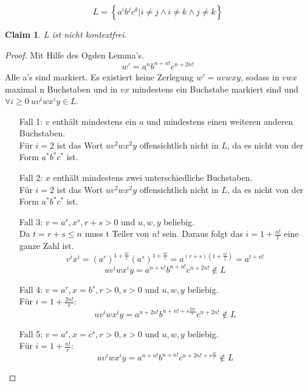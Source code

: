 \documentclass[]{article}
\newtheorem{claim}[theorem]{Claim}
\begin{document}
$$L=\left\lbrace a^ib^jc^k|i\neq j \wedge i\neq k \wedge j\neq k \right\rbrace$$
\begin{claim}
L ist nicht kontextfrei.
\end{claim}
\begin{proof}
Mit Hilfe des Ogden Lemma's.
$$w'=\underline{a^n}b^{n+n!}c^{n+2n!}$$
Alle a's sind markiert.
Es existiert keine Zerlegung $w'=uvwxy$, sodass in $vwx$ maximal n Buchstaben und in $vx$ mindestens ein Buchstabe markiert sind und $\forall i\geq0\ uv^iwx^iy\in L$.
\begin{itemize}
\item[Fall 1:] $v$ enth\"alt mindestens ein $a$ und mindestens einen weiteren anderen Buchstaben.\\ 
F\"ur $i=2$ ist das Wort $uv^2wx^2y$ offensichtlich nicht in $L$, da es nicht von der Form $a^*b^*c^*$ ist.
\item[Fall 2:] $x$ enth\"alt mindestens zwei unterschiedliche Buchstaben.\\ 
F\"ur $i=2$ ist das Wort $uv^2wx^2y$ offensichtlich nicht in $L$, da es nicht von der Form $a^*b^*c^*$ ist.
\item[Fall 3:] $v=a^r,x^s,r+s>0$ und $u,w,y$ beliebig.\\
Da $t=r+s\leq n$ muss t Teiler von $n!$ sein.
Daraus folgt das $i=1+\frac{n!}{t}$ eine ganze Zahl ist. 
$$v^ix^i=(a^{r})^{1+\frac{n!}{t}}(a^{s})^{1+\frac{n!}{t}}=a^{(r+s)(1+\frac{n!}{t})}=a^{t+n!}$$
$$uv^iwx^iy=a^{n+n!}b^{n+n!}c^{n+2n!}\notin L$$
\item[Fall 4:] $v=a^r,x=b^s,r>0,s>0$ und $u,w,y$ beliebig.\\
F\"ur $i=1+\frac{2n!}{r}$:
$$uv^iwx^iy=a^{n+2n!}b^{n+n!+s\frac{2n!}{r}}c^{n+2n!}\notin L$$
\item[Fall 5:] $v=a^r,x=c^s,r>0,s>0$ und $u,w,y$ beliebig.\\
F\"ur $i=1+\frac{n!}{r}$:
$$uv^iwx^iy=a^{n+n!}b^{n+n!}c^{n+2n!+s\frac{n!}{r}}\notin L$$
\end{itemize}
\end{proof}
\end{document}
